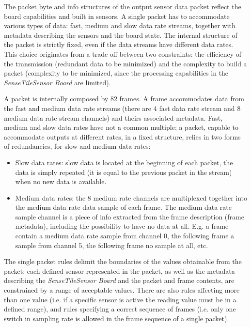 \documentclass{article}
\newcommand{\ST}{\emph{SenseTile}\xspace}
\newcommand{\SB}{\emph{Sensor Board}\xspace}
\newcommand{\STSB}{\ST \SB\xspace}
\begin{document}
The packet byte and info structures of the output sensor data packet reflect the board capabilities and built in sensors. 
A single packet has to accommodate various types of data: fast, medium and slow data rate streams, together with metadata describing the sensors and the board state.
The internal structure of the packet is strictly fixed, even if the data streams have different data rates. 
This choice originates from a trade-off between two constraints: the efficiency of the transmission (redundant data to be minimized) and the complexity to build a packet (complexity to be minimized, since the processing capabilities in the \STSB are limited). 

A packet is internally composed by 82 frames. 
A frame accommodates data from the fast and medium data rate streams (there are 4 fast data rate stream and 8 medium data rate stream channels) and theirs associated metadata.
Fast, medium and slow data rates have not a common multiple; a packet, capable to accommodate outputs at different rates, in a fixed structure, relies in two forms of redundancies, for slow and medium data rates:
\begin{itemize}
\item Slow data rates: slow data is located at the beginning of each packet, the data is simply repeated (it is equal to the previous packet in the stream) when no new data is available.
\item Medium data rates: the 8 medium rate channels are multiplexed together into the medium data rate data sample of each frame. The medium data rate sample channel is a piece of info extracted from the frame description (frame metadata), including the possibility to have no data at all. 
E.g. a frame contain a medium data rate sample from channel 0, the following frame a sample from channel 5, the following frame no sample at all, etc.
\end{itemize}

The single packet rules delimit the boundaries of the values obtainable from the packet: each defined sensor represented in the packet, as well as the metadata describing the \STSB and the packet and frame contents, are constrained by a range of acceptable values.
There are also rules affecting more than one value (i.e. if a specific sensor is active the reading value must be in a defined range), and rules specifying a correct sequence of frames (i.e. only one switch in sampling rate is allowed in the frame sequence of a single packet).
\end{document}
